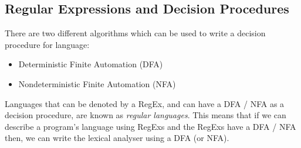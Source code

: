 \subsection{Regular Expressions and Decision Procedures}
There are two different algorithms which can be used to write a decision procedure for language:
\begin{itemize}
    \item Deterministic Finite Automation (DFA)
    \item Nondeterministic Finite Automation (NFA)
\end{itemize}
Languages that can be denoted by a RegEx, and can have a DFA / NFA as a decision procedure, are known as \textit{regular languages}. This means that  if we can describe a program's language using RegExs and the RegExs have a DFA / NFA then, we can write the lexical analyser using a DFA (or NFA). 